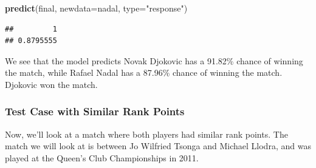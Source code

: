 \documentclass[]{article}
\newenvironment{Shaded}{\begin{snugshade}}{\end{snugshade}}
\newcommand{\DataTypeTok}[1]{\textcolor[rgb]{0.13,0.29,0.53}{#1}}
\newcommand{\DecValTok}[1]{\textcolor[rgb]{0.00,0.00,0.81}{#1}}
\newcommand{\KeywordTok}[1]{\textcolor[rgb]{0.13,0.29,0.53}{\textbf{#1}}}
\newcommand{\NormalTok}[1]{#1}
\newcommand{\OperatorTok}[1]{\textcolor[rgb]{0.81,0.36,0.00}{\textbf{#1}}}
\newcommand{\StringTok}[1]{\textcolor[rgb]{0.31,0.60,0.02}{#1}}
\begin{document}
\begin{Shaded}
\begin{Highlighting}[]
\KeywordTok{predict}\NormalTok{(final, }\DataTypeTok{newdata=}\NormalTok{nadal, }\DataTypeTok{type=}\StringTok{"response"}\NormalTok{)}
\end{Highlighting}
\end{Shaded}

\begin{verbatim}
##         1 
## 0.8795555
\end{verbatim}

We see that the model predicts Novak Djokovic has a 91.82\% chance of
winning the match, while Rafael Nadal has a 87.96\% chance of winning
the match. Djokovic won the match.

\hypertarget{test-case-with-similar-rank-points}{%
\subsubsection{Test Case with Similar Rank
Points}\label{test-case-with-similar-rank-points}}

Now, we'll look at a match where both players had similar rank points.
The match we will look at is between Jo Wilfried Tsonga and Michael
Llodra, and was played at the Queen's Club Championships in 2011.

\begin{Shaded}
\end{Shaded}
\end{document}
